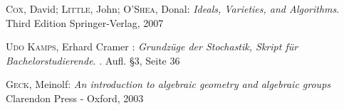 \documentclass{article}
\begin{document}
\begin{thebibliography}{99}
	\textsc{Cox}, David; \textsc{Little}, John; \textsc{O'Shea}, Donal:
	\newblock \emph{Ideals, Varieties, and Algorithms}.
	\newblock Third Edition
	\newblock Springer-Verlag, 2007
	
	\textsc{Udo Kamps}, Erhard Cramer :
	\newblock \emph{Grundzüge der Stochastik, Skript für Bachelorstudierende}.
	. Aufl.
	\newblock §3, Seite 36
	
	\textsc{Geck}, Meinolf:
	\newblock \emph{An introduction to algebraic geometry and algebraic groups}
	\newblock Clarendon Press - Oxford, 2003
\end{thebibliography}
\end{document}

